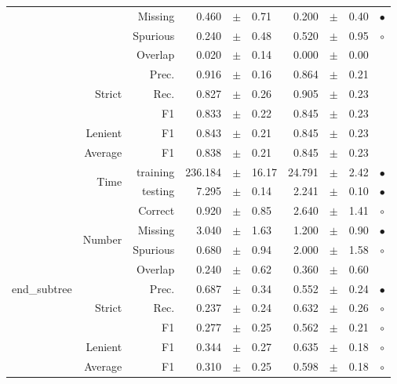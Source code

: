 \begin{longtable}{|r|r|r||rcl|rcl|c|}
\cline{3-10}
  &  &  Missing  & 0.460 &  $\pm$  & 0.71 & 0.200 &  $\pm$  & 0.40 &  $\bullet$\\
\cline{3-10}
  &  &  Spurious  & 0.240 &  $\pm$  & 0.48 & 0.520 &  $\pm$  & 0.95 &  $\circ$\\
\cline{3-10}
  &  &  Overlap  & 0.020 &  $\pm$  & 0.14 & 0.000 &  $\pm$  & 0.00 &   \\
\cline{2-10}
  & \multirow{3}{*}{Strict} &  Prec.  & 0.916 &  $\pm$  & 0.16 & 0.864 &  $\pm$  & 0.21 &   \\
\cline{3-10}
  &  &  Rec.  & 0.827 &  $\pm$  & 0.26 & 0.905 &  $\pm$  & 0.23 &   \\
\cline{3-10}
  &  &  F1  & 0.833 &  $\pm$  & 0.22 & 0.845 &  $\pm$  & 0.23 &   \\
\cline{2-10}
  & Lenient &  F1  & 0.843 &  $\pm$  & 0.21 & 0.845 &  $\pm$  & 0.23 &   \\
\cline{2-10}
  & Average &  F1  & 0.838 &  $\pm$  & 0.21 & 0.845 &  $\pm$  & 0.23 &   \\
\cline{2-10}
  & \multirow{2}{*}{Time} &  training  & 236.184 &  $\pm$  & 16.17 & 24.791 &  $\pm$  & 2.42 &  $\bullet$\\
\cline{3-10}
  &  &  testing  & 7.295 &  $\pm$  & 0.14 & 2.241 &  $\pm$  & 0.10 &  $\bullet$\\
\hline
\hline
\multirow{11}{*}{\begin{sideways}end\_subtree\end{sideways} } & \multirow{4}{*}{Number} &  Correct  & 0.920 &  $\pm$  & 0.85 & 2.640 &  $\pm$  & 1.41 &  $\circ$\\
\cline{3-10}
  &  &  Missing  & 3.040 &  $\pm$  & 1.63 & 1.200 &  $\pm$  & 0.90 &  $\bullet$\\
\cline{3-10}
  &  &  Spurious  & 0.680 &  $\pm$  & 0.94 & 2.000 &  $\pm$  & 1.58 &  $\circ$\\
\cline{3-10}
  &  &  Overlap  & 0.240 &  $\pm$  & 0.62 & 0.360 &  $\pm$  & 0.60 &   \\
\cline{2-10}
  & \multirow{3}{*}{Strict} &  Prec.  & 0.687 &  $\pm$  & 0.34 & 0.552 &  $\pm$  & 0.24 &  $\bullet$\\
\cline{3-10}
  &  &  Rec.  & 0.237 &  $\pm$  & 0.24 & 0.632 &  $\pm$  & 0.26 &  $\circ$\\
\cline{3-10}
  &  &  F1  & 0.277 &  $\pm$  & 0.25 & 0.562 &  $\pm$  & 0.21 &  $\circ$\\
\cline{2-10}
  & Lenient &  F1  & 0.344 &  $\pm$  & 0.27 & 0.635 &  $\pm$  & 0.18 &  $\circ$\\
\cline{2-10}
  & Average &  F1  & 0.310 &  $\pm$  & 0.25 & 0.598 &  $\pm$  & 0.18 &  $\circ$\\

\end{longtable}

